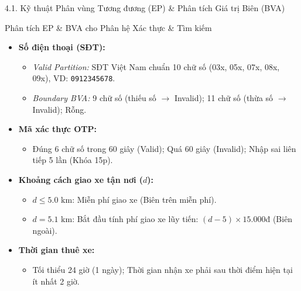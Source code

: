 \documentclass[aspectratio=169,10pt]{beamer}
\begin{document}
\begin{frame}{4.1. Kỹ thuật Phân vùng Tương đương (EP) \& Phân tích Giá trị Biên (BVA)}
  \begin{exampleblock}{Phân tích EP \& BVA cho Phân hệ Xác thực \& Tìm kiếm}
    \begin{itemize}
      \item \textbf{Số điện thoại (SĐT):}
        \begin{itemize}
          \item \textit{Valid Partition:} SĐT Việt Nam chuẩn 10 chữ số (03x, 05x, 07x, 08x, 09x), VD: \texttt{0912345678}.
          \item \textit{Boundary BVA:} 9 chữ số (thiếu số $\rightarrow$ Invalid); 11 chữ số (thừa số $\rightarrow$ Invalid); Rỗng.
        \end{itemize}
      \item \textbf{Mã xác thực OTP:}
        \begin{itemize}
          \item Đúng 6 chữ số trong 60 giây (Valid); Quá 60 giây (Invalid); Nhập sai liên tiếp 5 lần (Khóa 15p).
        \end{itemize}
      \item \textbf{Khoảng cách giao xe tận nơi ($d$):}
        \begin{itemize}
          \item $d \le 5.0\text{ km}$: Miễn phí giao xe (Biên trên miễn phí).
          \item $d = 5.1\text{ km}$: Bắt đầu tính phí giao xe lũy tiến: $(d - 5) \times 15.000$đ (Biên ngoài).
        \end{itemize}
      \item \textbf{Thời gian thuê xe:}
        \begin{itemize}
          \item Tối thiểu 24 giờ (1 ngày); Thời gian nhận xe phải sau thời điểm hiện tại ít nhất 2 giờ.
        \end{itemize}
    \end{itemize}
  \end{exampleblock}
\end{frame}
\end{document}
